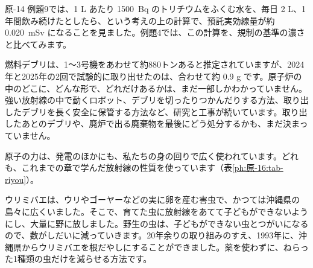 原-14 例題9では、1 L あたり \qty{1500}{Bq} のトリチウムをふくむ水を、毎日 2 L、1年間飲み続けたとしたら、という考えの上の計算で、預託実効線量が約 \qty{0.020}{mSv} になることを見ました。例題4では、この計算を、規制の基準の濃さと比べてみます。

\begin{phmada}
燃料デブリは、1〜3号機をあわせて約880トンあると推定されていますが、2024年と2025年の2回で試験的に取り出せたのは、合わせて約 0.9 g です。原子炉の中のどこに、どんな形で、どれだけあるかは、まだ一部しかわかっていません。強い放射線の中で動くロボット、デブリを切ったりつかんだりする方法、取り出したデブリを長く安全に保管する方法など、研究と工事が続いています。取り出したあとのデブリや、廃炉で出る廃棄物を最後にどう処分するかも、まだ決まっていません。
\end{phmada}

\leavevmode\label{ph:原-16:sec8}原子の力は、発電のほかにも、私たちの身の回りで広く使われています。どれも、これまでの章で学んだ放射線の性質を使っています（表\ref{ph:原-16:tab-riyou}）。

\begin{phmijika}[沖縄県のウリミバエの根絶]
ウリミバエは、ウリやゴーヤーなどの実に卵を産む害虫で、かつては沖縄県の島々に広くいました。そこで、育てた虫に放射線をあてて子どもができないようにし、大量に野に放しました。野生の虫は、子どもができない虫とつがいになるので、数がしだいに減っていきます。20年余りの取り組みのすえ、1993年に、沖縄県からウリミバエを根だやしにすることができました。薬を使わずに、ねらった1種類の虫だけを減らせる方法です。
\end{phmijika}

